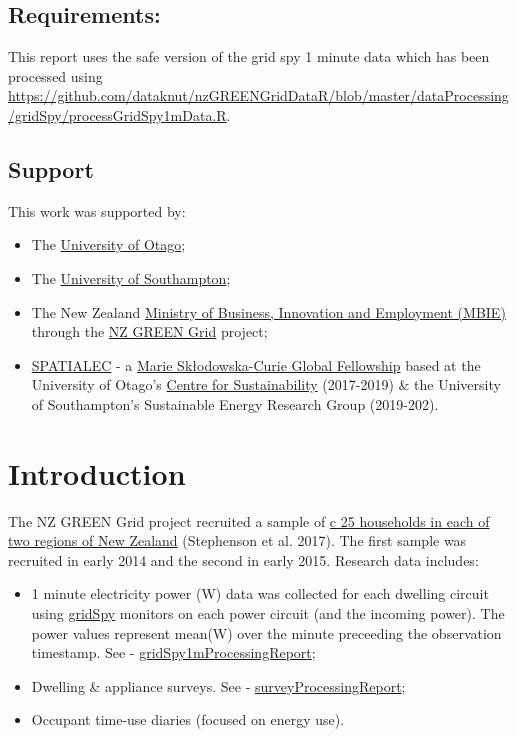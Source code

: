 \documentclass[]{article}
\providecommand{\tightlist}{%
  \setlength{\itemsep}{0pt}\setlength{\parskip}{0pt}}
\theoremstyle{definition}
\theoremstyle{definition}
\theoremstyle{definition}
\theoremstyle{remark}
\begin{document}
\subsection{Requirements:}\label{requirements}

This report uses the safe version of the grid spy 1 minute data which
has been processed using
\url{https://github.com/dataknut/nzGREENGridDataR/blob/master/dataProcessing/gridSpy/processGridSpy1mData.R}.

\subsection{Support}\label{support}

This work was supported by:

\begin{itemize}
\tightlist
\item
  The \href{https://www.otago.ac.nz/}{University of Otago};
\item
  The \href{https://www.southampton.ac.uk/}{University of Southampton};
\item
  The New Zealand \href{http://www.mbie.govt.nz/}{Ministry of Business,
  Innovation and Employment (MBIE)} through the
  \href{https://www.otago.ac.nz/centre-sustainability/research/energy/otago050285.html}{NZ
  GREEN Grid} project;
\item
  \href{http://www.energy.soton.ac.uk/tag/spatialec/}{SPATIALEC} - a
  \href{http://ec.europa.eu/research/mariecurieactions/about-msca/actions/if/index_en.htm}{Marie
  Skłodowska-Curie Global Fellowship} based at the University of Otago's
  \href{http://www.otago.ac.nz/centre-sustainability/staff/otago673896.html}{Centre
  for Sustainability} (2017-2019) \& the University of Southampton's
  Sustainable Energy Research Group (2019-202).
\end{itemize}

\newpage

\section{Introduction}\label{introduction}

The NZ GREEN Grid project recruited a sample of
\href{ggOverviewReport.html}{c 25 households in each of two regions of
New Zealand} (Stephenson et al. 2017). The first sample was recruited in
early 2014 and the second in early 2015. Research data includes:

\begin{itemize}
\tightlist
\item
  1 minute electricity power (W) data was collected for each dwelling
  circuit using \href{https://gridspy.com/}{gridSpy} monitors on each
  power circuit (and the incoming power). The power values represent
  mean(W) over the minute preceeding the observation timestamp. See -
  \href{gridSpy1mProcessingReport.html}{gridSpy1mProcessingReport};
\item
  Dwelling \& appliance surveys. See -
  \href{surveyProcessingReport.html}{surveyProcessingReport};
\item
  Occupant time-use diaries (focused on energy use).
\end{itemize}
\end{document}
